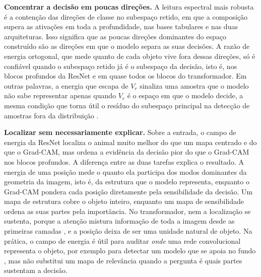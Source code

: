 \textbf{Concentrar a decisão em poucas direções.} A leitura espectral mais robusta é a contenção das direções de classe no subespaço retido, em que a composição supera as ativações em toda a profundidade, nas bases tabulares e nas duas arquiteturas. Isso significa que as poucas direções dominantes do espaço construído são as direções em que o modelo separa as suas decisões. A razão de energia ortogonal, que mede quanto de cada objeto vive fora dessas direções, só é confiável quando o subespaço retido já é o subespaço da decisão, isto é, nos blocos profundos da ResNet e em quase todos os blocos do transformador. Em outras palavras, a energia que escapa de $V_r$ sinaliza uma amostra que o modelo não sabe representar apenas quando $V_r$ é o espaço em que o modelo decide, a mesma condição que torna útil o resíduo do subespaço principal na detecção de amostras fora da distribuição \citep{Wang2022ViM}.

\textbf{Localizar sem necessariamente explicar.} Sobre a entrada, o campo de energia da ResNet localiza o animal muito melhor do que um mapa centrado e do que o Grad-CAM, mas ordena a evidência da decisão pior do que o Grad-CAM nos blocos profundos. A diferença entre as duas tarefas explica o resultado. A energia de uma posição mede o quanto ela participa dos modos dominantes da geometria da imagem, isto é, da estrutura que o modelo representa, enquanto o Grad-CAM pondera cada posição diretamente pela sensibilidade da decisão. Um mapa de estrutura cobre o objeto inteiro, enquanto um mapa de sensibilidade ordena as suas partes pela importância. No transformador, nem a localização se sustenta, porque a atenção mistura informação de toda a imagem desde as primeiras camadas \citep{Raghu2021}, e a posição deixa de ser uma unidade natural de objeto. Na prática, o campo de energia é útil para auditar \textit{onde} uma rede convolucional representa o objeto, por exemplo para detectar um modelo que se apoia no fundo \citep{Geirhos2020}, mas não substitui um mapa de relevância quando a pergunta é quais partes sustentam a decisão.

